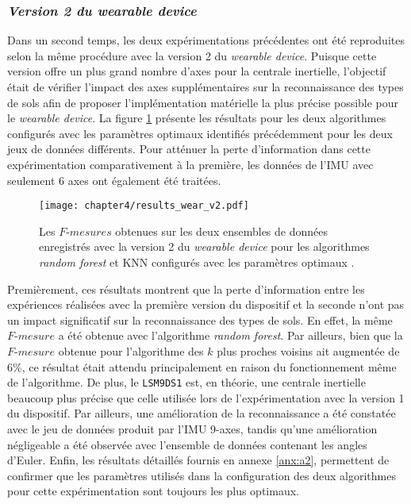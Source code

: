 \subsubsection{\textit{Version 2 du wearable device}}

Dans un second temps, les deux expérimentations précédentes ont été reproduites selon la même procédure avec la version 2 du \textit{wearable device}. Puisque cette version offre un plus grand nombre d'axes pour la centrale inertielle, l'objectif était de vérifier l'impact des axes supplémentaires sur la reconnaissance des types de sols afin de proposer l'implémentation matérielle la plus précise possible pour le \textit{wearable device}. La figure \ref{fig:results_wear_v2} présente les résultats pour les deux algorithmes configurés avec les paramètres optimaux identifiés précédemment pour les deux jeux de données différents. Pour atténuer la perte d'information dans cette expérimentation comparativement à la première, les données de l'\acs{IMU} avec seulement 6 axes ont également été traitées.

\begin{figure}[H]
	\centering
	\texttt{[image: chapter4/results\_wear\_v2.pdf]}
        \caption[Les $F\mbox{-} mesures$ obtenues sur les deux ensembles de données enregistrés avec la version 2 du \textit{wearable device} pour les algorithmes \textit{random forest} et \acs{KNN} configurés avec les paramètres optimaux.]{Les $F\mbox{-} mesures$ obtenues sur les deux ensembles de données enregistrés avec la version 2 du \textit{wearable device} pour les algorithmes \textit{random forest} et \acs{KNN} configurés avec les paramètres optimaux \citep{Thullier2017}.}
	\label{fig:results_wear_v2}
\end{figure}

Premièrement, ces résultats montrent que la perte d'information entre les expériences réalisées avec la première version du dispositif et la seconde n'ont pas un impact significatif sur la reconnaissance des types de sols. En effet, la même $F\mbox{-}mesure$ a été obtenue avec l'algorithme \textit{random forest}. Par ailleurs, bien que la $F\mbox{-}mesure$ obtenue pour l'algorithme des $k$ plus proches voisins ait augmentée de 6\%, ce résultat était attendu principalement en raison du fonctionnement même de l'algorithme. De plus, le \texttt{LSM9DS1} est, en théorie, une centrale inertielle beaucoup plus précise que celle utilisée lors de l'expérimentation avec la version 1 du dispositif. Par ailleurs, une amélioration de la reconnaissance a été constatée avec le jeu de données produit par l'\acs{IMU} 9-axes, tandis qu'une amélioration négligeable a été observée avec l'ensemble de données contenant les angles d'Euler. Enfin, les résultats détaillés fournis en annexe \ref{anx:a2}, permettent de confirmer que les paramètres utilisés dans la configuration des deux algorithmes pour cette expérimentation sont toujours les plus optimaux.

